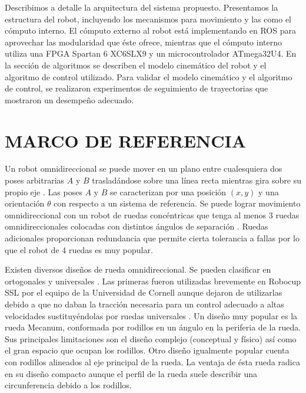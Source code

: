 \documentclass[twocolumn,10pt]{amrob}
\newcommand{\TODO}[1]{{\color{red}{ToDo: {#1}}}}
\begin{document}
Describimos a detalle la arquitectura del sistema propuesto. Presentamos la estructura del robot, incluyendo los mecanismos para movimiento y las como el cómputo interno. El cómputo externo al robot está implementando en ROS para aprovechar las modularidad que éste ofrece, mientras que el cómputo interno utiliza una FPGA Spartan 6 XC6SLX9 y un microcontrolador ATmega32U4. En la sección de algoritmos se describen el modelo cinemático del robot y el algoritmo de control utilizado. Para validar el modelo cinemático y el algoritmo de control, se realizaron experimentos de seguimiento de trayectorias que mostraron un desempeño adecuado.


\section*{MARCO DE REFERENCIA}

Un robot omnidireccional se puede mover en un plano entre cualesquiera dos poses arbitrarias $A$ y $B$ trasladándose sobre una línea recta mientras gira sobre su propio eje \cite{rojas2005short}. Las poses $A$ y $B$ se caracterizan por una posición $(x,y)$ y una orientación $\theta$ con respecto a un sistema de referencia. Se puede lograr movimiento omnidireccional con un robot de ruedas concéntricas que tenga al menos 3 ruedas omnidireccionales colocadas con distintos ángulos de separación \cite{rojas2006holonomic}. Ruedas adicionales proporcionan redundancia que permite cierta tolerancia a fallas por lo que el robot de 4 ruedas es muy popular.

Existen diversos diseños de rueda omnidireccional. Se pueden clasificar en ortogonales y universales \cite{ashmore2002omni}. Las primeras fueron utilizadas brevemente en Robocup SSL por el equipo de la Universidad de Cornell \cite{d2000cornell} aunque dejaron de utilizarlas debido a que no daban la tracción necesaria para un control adecuado a altas velocidades sustituyéndolas por ruedas universales \cite{purwin2003cornell}. Un diseño muy popular es la rueda Mecanum, conformada por rodillos en un ángulo en la periferia de la rueda. Sus principales limitaciones son el diseño complejo (conceptual y físico) así como el gran espacio que ocupan los rodillos. Otro diseño igualmente popular cuenta con rodillos alineados al eje principal de la rueda. La ventaja de ésta rueda radica en su diseño compacto aunque el perfil de la rueda suele describir una circunferencia debido a los rodillos. 
\end{document}
